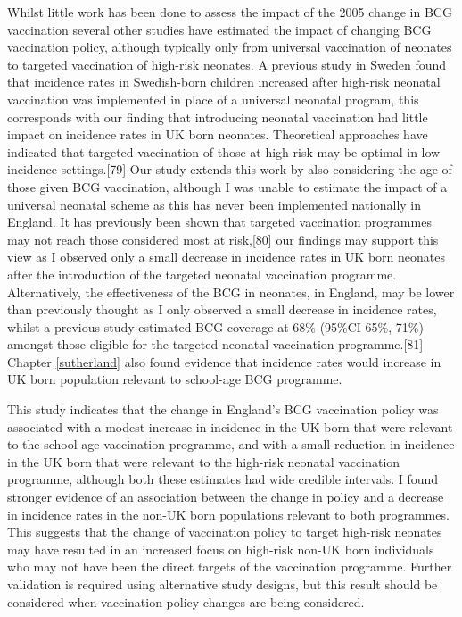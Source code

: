 \documentclass[11pt,twoside]{bristolthesis}
\begin{document}
  Whilst little work has been done to assess the impact of the 2005 change in BCG vaccination several other studies have estimated the impact of changing BCG vaccination policy, although typically only from universal vaccination of neonates to targeted vaccination of high-risk neonates. A previous study in Sweden found that incidence rates in Swedish-born children increased after high-risk neonatal vaccination was implemented in place of a universal neonatal program, this corresponds with our finding that introducing neonatal vaccination had little impact on incidence rates in UK born neonates. Theoretical approaches have indicated that targeted vaccination of those at high-risk may be optimal in low incidence settings.{[}79{]} Our study extends this work by also considering the age of those given BCG vaccination, although I was unable to estimate the impact of a universal neonatal scheme as this has never been implemented nationally in England. It has previously been shown that targeted vaccination programmes may not reach those considered most at risk,{[}80{]} our findings may support this view as I observed only a small decrease in incidence rates in UK born neonates after the introduction of the targeted neonatal vaccination programme. Alternatively, the effectiveness of the BCG in neonates, in England, may be lower than previously thought as I only observed a small decrease in incidence rates, whilst a previous study estimated BCG coverage at 68\% (95\%CI 65\%, 71\%) amongst those eligible for the targeted neonatal vaccination programme.{[}81{]} Chapter \ref{sutherland} also found evidence that incidence rates would increase in UK born population relevant to school-age BCG programme.
  
  This study indicates that the change in England's BCG vaccination policy was associated with a modest increase in incidence in the UK born that were relevant to the school-age vaccination programme, and with a small reduction in incidence in the UK born that were relevant to the high-risk neonatal vaccination programme, although both these estimates had wide credible intervals. I found stronger evidence of an association between the change in policy and a decrease in incidence rates in the non-UK born populations relevant to both programmes. This suggests that the change of vaccination policy to target high-risk neonates may have resulted in an increased focus on high-risk non-UK born individuals who may not have been the direct targets of the vaccination programme. Further validation is required using alternative study designs, but this result should be considered when vaccination policy changes are being considered.
  
\end{document}
